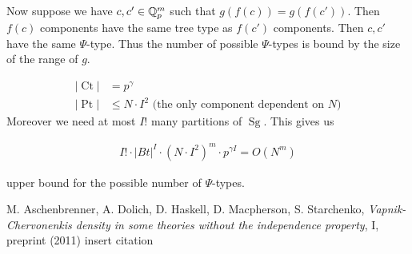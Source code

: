 \documentclass{amsart}
\DeclareMathOperator{\Sg}{Sg}
\DeclareMathOperator{\Pt}{Pt}
\DeclareMathOperator{\Ct}{Ct}
\begin{document}
Now suppose we have $c, c' \in \mathbb{Q}_p^m$ such that $g(f(c)) = g(f(c'))$.
Then $f(c)$ components have the same tree type as $f(c')$ components.
Then $c, c'$ have the same $\Psi$-type.
Thus the number of possible $\Psi$-types is bound by the size of the range of $g$.

\begin{align*}
	|\Ct| &= p^\gamma \\
	|\Pt| &\leq N \cdot I^2 \text { (the only component dependent on $N$)}
\end{align*}
Moreover we need at most $I!$ many partitions of $\Sg$. This gives us

\begin{align*}
	I! \cdot |Bt|^I \cdot (N \cdot I^2)^m \cdot p^{\gamma I} = O(N^m)
\end{align*}

upper bound for the possible number of $\Psi$-types.

\begin{thebibliography}{9}
		M. Aschenbrenner, A. Dolich, D. Haskell, D. Macpherson, S. Starchenko,
		\textit{Vapnik-Chervonenkis density in some theories without the independence property}, I, preprint (2011)
		insert citation
\end{thebibliography}
\end{document}
